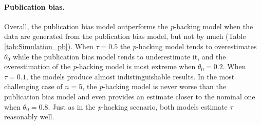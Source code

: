 \documentclass{article}
\theoremstyle{plain}
\theoremstyle{definition}
\begin{document}
\paragraph{Publication bias.} 
Overall, the publication bias model outperforms the \textit{p}-hacking model when the data are generated from the publication bias model, but not by much (Table \ref{tab:Simulation_pb}). When $\tau = 0.5$ the \textit{p}-hacking model tends to overestimates $\theta_0$ while the publication bias model tends to underestimate it, and the overestimation of the \textit{p}-hacking model is most extreme when $\theta_0 = 0.2$. When $\tau = 0.1$, the models produce almost indistinguishable results. In the most challenging case of $n=5$, the \textit{p}-hacking model is never worse than the publication bias model and even provides an estimate closer to the nominal one when $\theta_0 = 0.8$. Just as in the \textit{p}-hacking scenario, both models estimate $\tau$ reasonably well.
\end{document}
